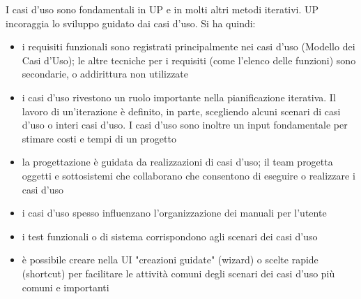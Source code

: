 \documentclass[a4paper,12pt, oneside]{book}
\begin{document}
\newpage
I casi d'uso sono fondamentali in UP e in molti altri metodi iterativi. UP incoraggia lo sviluppo guidato dai casi d'uso. Si ha quindi:
\begin{itemize}
	\item i requisiti funzionali sono registrati principalmente nei casi d'uso (Modello dei Casi d'Uso); le altre tecniche per i requisiti (come l'elenco delle funzioni) sono secondarie, o addirittura non utilizzate
	\item i casi d'uso rivestono un ruolo importante nella pianificazione iterativa. Il lavoro di un'iterazione è definito, in parte, scegliendo alcuni scenari di casi d'uso o interi casi d'uso. I casi d'uso sono inoltre un input fondamentale per stimare costi e tempi di un progetto
	\item la progettazione è guidata da realizzazioni di casi d'uso; il team progetta oggetti e sottosistemi che collaborano che consentono di eseguire o realizzare i casi d'uso
	\item i casi d'uso spesso influenzano l'organizzazione dei manuali per l'utente
	\item i test funzionali o di sistema corrispondono agli scenari dei casi d'uso
	\item è possibile creare nella UI "creazioni guidate" (wizard) o scelte rapide (shortcut) per facilitare le attività comuni degli scenari dei casi d'uso più comuni e importanti
\end{itemize}
\end{document}
